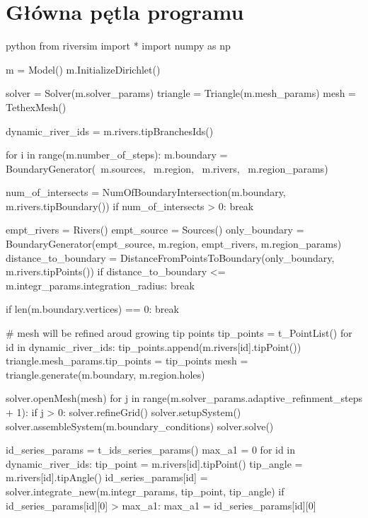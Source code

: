 \documentclass[]{pracamgr}
\begin{document}
  

  \appendix

  \chapter{Główna pętla programu}
    \begin{mintedbox}{python} 
      from riversim import *
      import numpy as np

      m = Model()
      m.InitializeDirichlet()

      solver = Solver(m.solver_params)
      triangle = Triangle(m.mesh_params)
      mesh = TethexMesh()

      dynamic_river_ids = m.rivers.tipBranchesIds()

      for i in range(m.number_of_steps):
          m.boundary = BoundaryGenerator(\
              m.sources, \
              m.region, \
              m.rivers, \
              m.region_params)

          num_of_intersects = NumOfBoundaryIntersection(m.boundary, m.rivers.tipBoundary())
          if num_of_intersects > 0:
              break

          empt_rivers = Rivers()
          empt_source = Sources()
          only_boundary = BoundaryGenerator(empt_source, m.region, empt_rivers, m.region_params)
          distance_to_boundary = DistanceFromPointsToBoundary(only_boundary, m.rivers.tipPoints())
          if distance_to_boundary <= m.integr_params.integration_radius:
              break

          if len(m.boundary.vertices) == 0:
              break 

          # mesh will be refined aroud growing tip points
          tip_points = t_PointList()
          for id in dynamic_river_ids:
              tip_points.append(m.rivers[id].tipPoint())
          triangle.mesh_params.tip_points = tip_points
          mesh = triangle.generate(m.boundary, m.region.holes)
              
          solver.openMesh(mesh)
          for j in range(m.solver_params.adaptive_refinment_steps + 1):
              if j > 0:
                  solver.refineGrid()
              solver.setupSystem()
              solver.assembleSystem(m.boundary_conditions)
              solver.solve()

          id_series_params = t_ids_series_params()
          max_a1 = 0
          for id in dynamic_river_ids:
              tip_point = m.rivers[id].tipPoint()
              tip_angle = m.rivers[id].tipAngle()
              id_series_params[id] = solver.integrate_new(m.integr_params, tip_point, tip_angle)
              if id_series_params[id][0] > max_a1:
                  max_a1 = id_series_params[id][0]


\end{mintedbox}
\end{document}

